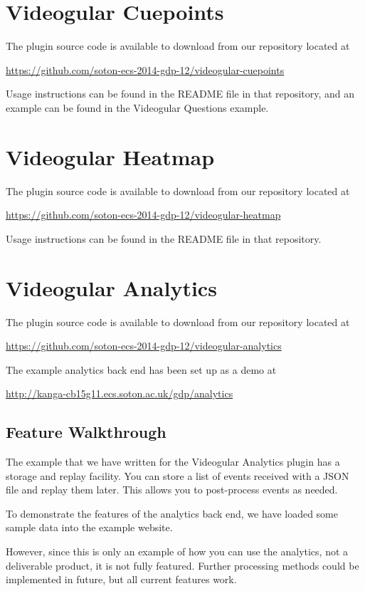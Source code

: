 \documentclass[12pt,a4paper]{article}
\begin{document}
\section{Videogular Cuepoints}

The plugin source code is available to download from our repository located at

\url{https://github.com/soton-ecs-2014-gdp-12/videogular-cuepoints}

Usage instructions can be found in the README file in that repository, and an example can be found in the Videogular Questions example.

\section{Videogular Heatmap}

The plugin source code is available to download from our repository located at

\url{https://github.com/soton-ecs-2014-gdp-12/videogular-heatmap}

Usage instructions can be found in the README file in that repository.

\section{Videogular Analytics}

The plugin source code is available to download from our repository located at

\url{https://github.com/soton-ecs-2014-gdp-12/videogular-analytics}

The example analytics back end has been set up as a demo at

\url{http://kanga-cb15g11.ecs.soton.ac.uk/gdp/analytics}

\subsection{Feature Walkthrough}

The example that we have written for the Videogular Analytics plugin has a storage and replay facility. You can store a list of events received with a JSON file and replay them later. This allows you to post-process events as needed.

To demonstrate the features of the analytics back end, we have loaded some sample data into the example website.

However, since this is only an example of how you can use the analytics, not a deliverable product, it is not fully featured. Further processing methods could be implemented in future, but all current features work.
\end{document}
